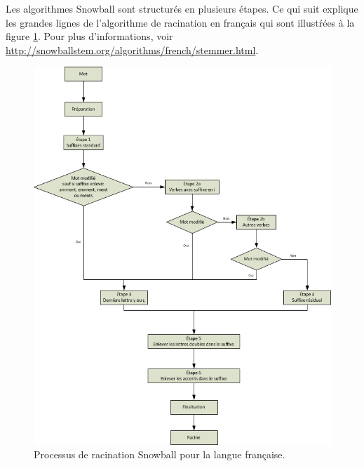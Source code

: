 Les algorithmes Snowball sont structur\'es en plusieurs \'etapes.
Ce qui suit explique les grandes lignes de l'algorithme de racination en fran\c{c}ais qui sont illust\'rées \`a la figure \ref{snowball-process}.
Pour plus d'informations, voir \url{http://snowballstem.org/algorithms/french/stemmer.html}.
\begin{figure}[h!]
  \includegraphics[scale=0.7]{images/snowball.png}
  \caption{Processus de racination Snowball pour la langue fran\c{c}aise.}
  \label{snowball-process}
\end{figure}

